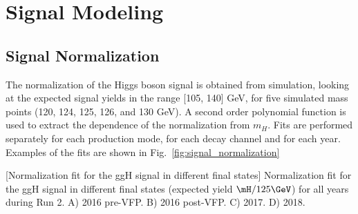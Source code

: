 \section{Signal Modeling}
\label{sec:signal_model}

\subsection{Signal Normalization}
\label{sec:SignalNormalization}
The normalization of the Higgs boson signal is obtained from simulation, 
looking at the expected signal yields in the range [105, 140] GeV, 
for five simulated mass points (120, 124, 125, 126, and 130 GeV).
A second order polynomial function is used to extract the dependence of the normalization from $m_{H}$.
Fits are performed separately for each production mode, for each decay channel and for each year. 
Examples of the fits are shown in Fig.~\ref{fig:signal_normalization}
\begin{multiFigure}
    \centering
        [Normalization fit for the ggH signal in different final states]
        {Normalization fit for the ggH signal in different final states (expected yield \vs $\mH / 125\GeV$) for all years during Run 2.
        \;A) 2016 pre-VFP.
        \;B) 2016 post-VFP.
        \;C) 2017.
        \;D) 2018.}
    \label{fig:signal_normalization}
\end{multiFigure}

